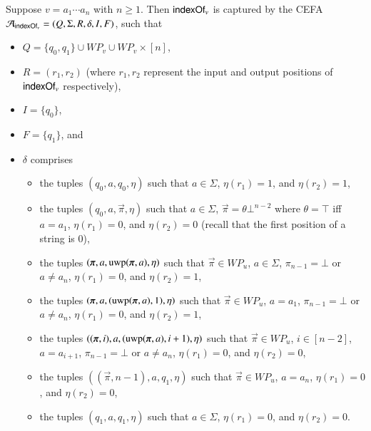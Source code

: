\begin{example}\label{exm:indexof}
Suppose $v = a_1 \cdots a_n$ with $n \ge 1$. Then $\mathsf{indexOf}_v$ is captured by the CEFA $\mathcal{A}_{\mathsf{indexOf}_v}=(Q, \Sigma, R, \delta, I, F)$, such that 
\begin{itemize}
\item $Q = \{q_0, q_1\} \cup WP_v \cup WP_v \times [n]$, 
\item $R=(r_1, r_2)$ (where $r_1,r_2$ represent the input and output positions of $\mathsf{indexOf}_v$ respectively), 
\item $I=\{q_0\}$, 
\item $F=\{q_1\}$, and 
\item $\delta$ comprises 
\begin{itemize}
\item the tuples $(q_0, a, q_0, \eta)$ such that $a \in \Sigma$, $\eta(r_1)=1$, and $\eta(r_2) = 1$,
%
\item the tuples $(q_0, a, \vec{\pi}, \eta)$ such that $a \in \Sigma$, $\vec{\pi} = \theta \bot^{n-2}$ where $\theta  = \top$ iff $a = a_1$, $\eta(r_1) = 0$, and $\eta(r_2)= 0$ (recall that the first position of a string is $0$),
% 
\item the tuples  $(\vec{\pi}, a, \uwp(\vec{\pi}, a), \eta)$ such that $\vec{\pi} \in WP_u$, $a \in \Sigma$, $\pi_{n-1} = \bot$ or $a \neq a_{n}$, $\eta(r_1) = 0$, and $\eta(r_2)= 1$,
%
\item the tuples $(\vec{\pi}, a, (\uwp(\vec{\pi}, a), 1), \eta)$ such that $\vec{\pi} \in WP_u$, $a = a_1$, $\pi_{n-1} = \bot$ or $a \neq a_{n}$, $\eta(r_1) = 0$, and $\eta(r_2)= 1$,
%
\item the tuples $((\vec{\pi}, i),  a, (\uwp(\vec{\pi}, a), i+1), \eta)$ such that $\vec{\pi} \in WP_u$, $i \in [n-2]$, $a = a_{i+1}$, $\pi_{n-1} = \bot$ or $a \neq a_{n}$, $\eta(r_1) = 0$, and $\eta(r_2)= 0$,
%
\item the tuples $((\vec{\pi}, n-1),  a, q_1, \eta)$ such that $\vec{\pi} \in WP_u$, $a = a_{n}$, $\eta(r_1) =0$, and $\eta(r_2)= 0$,
%
\item the tuples  $(q_1, a, q_1, \eta)$ such that $a \in \Sigma$, $\eta(r_1) = 0$, and $\eta(r_2)= 0$.
\end{itemize}
\end{itemize}
\end{example}